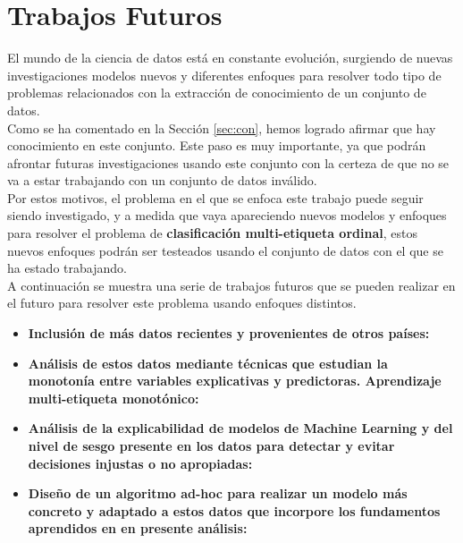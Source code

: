 \chapter{Trabajos Futuros}
El mundo de la ciencia de datos está en constante evolución, surgiendo de nuevas investigaciones modelos nuevos y diferentes enfoques para resolver todo tipo de problemas relacionados con la extracción de conocimiento de un conjunto de datos.\\
\linebreak
Como se ha comentado en la Sección \ref{sec:con}, hemos logrado afirmar que hay conocimiento en este conjunto. Este paso es muy importante, ya que podrán afrontar futuras investigaciones usando este conjunto con la certeza de que no se va a estar trabajando con un conjunto de datos inválido.\\
\linebreak
Por estos motivos, el problema en el que se enfoca este trabajo puede seguir siendo investigado, y a medida que vaya apareciendo nuevos modelos y enfoques para resolver el problema de\textbf{ clasificación multi-etiqueta ordinal}, estos nuevos enfoques podrán ser testeados usando el conjunto de datos con el que se ha estado trabajando.\\
\linebreak
A continuación se muestra una serie de trabajos futuros que se pueden realizar en el futuro para resolver este problema usando enfoques distintos.
\begin{itemize}
	\item\textbf{Inclusión de más datos recientes y provenientes de otros países:}
	\item \textbf{Análisis de estos datos mediante técnicas que estudian la monotonía entre variables explicativas y predictoras. Aprendizaje multi-etiqueta monotónico:}
	\item \textbf{Análisis de la explicabilidad de modelos de Machine Learning y del nivel de sesgo presente en los datos para detectar y evitar decisiones injustas o no apropiadas:}
	\item \textbf{Diseño de un algoritmo ad-hoc para realizar un modelo más concreto y adaptado a estos datos que incorpore los fundamentos aprendidos en en presente análisis:       }
\end{itemize}
